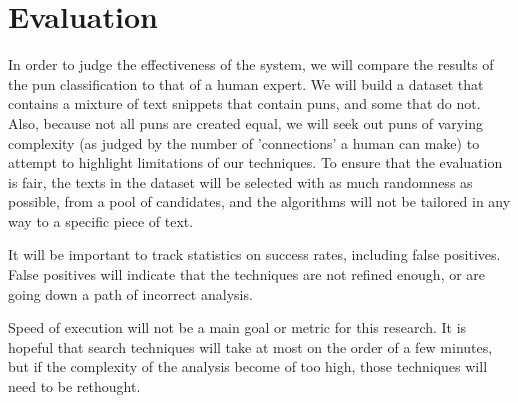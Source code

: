\section{Evaluation}

In order to judge the effectiveness of the system, we will compare the results of the pun classification to that of a human expert. We will build a dataset that contains a mixture of text snippets that contain puns, and some that do not. Also, because not all puns are created equal, we will seek out puns of varying complexity (as judged by the number of 'connections' a human can make) to attempt to highlight limitations of our techniques. To ensure that the evaluation is fair, the texts in the dataset will be selected with as much randomness as possible, from a pool of candidates, and the algorithms will not be tailored in any way to a specific piece of text.

It will be important to track statistics on success rates, including false positives. False positives will indicate that the techniques are not refined enough, or are going down a path of incorrect analysis.

Speed of execution will not be a main goal or metric for this research. It is hopeful that search techniques will take at most on the order of a few minutes, but if the complexity of the analysis become of too high, those techniques will need to be rethought.

